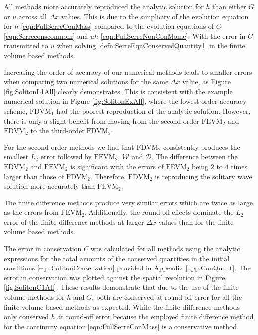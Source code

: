 All methods more accurately reproduced the analytic solution for $h$ than either $G$ or $u$ across all $\Delta x$ values. This is due to the simplicity of the evolution equation for $h$ \eqref{eqn:FullSerreConMass} compared to the evolution equations of $G$ \eqref{eqn:Serreconsconmom} and $uh$ \eqref{eqn:FullSerreNonConMome}. With the error in $G$ transmitted to $u$ when solving \eqref{defn:SerreEqnConservedQuantity1} in the finite volume based methods.

Increasing the order of accuracy of our numerical methods leads to smaller errors when comparing two numerical solutions for the same $\Delta x$ value, as Figure \ref{fig:SolitonL1All} clearly demonstrates. This is consistent with the example numerical solution in Figure \ref{fig:SolitonExAll}, where the lowest order accuracy scheme, $\text{FDVM}_1$ had the poorest reproduction of the analytic solution. However, there is only a slight benefit from moving from the second-order $\text{FEVM}_2$ and $\text{FDVM}_2$ to the third-order $\text{FDVM}_3$.

For the second-order methods we find that $\text{FDVM}_2$ consistently produces the smallest $L_2$ error followed by $\text{FEVM}_2$, $\mathcal{W}$ and $\mathcal{D}$. The difference between the $\text{FDVM}_2$ and $\text{FEVM}_2$ is significant with the errors of $\text{FEVM}_2$ being $2$ to $4$ times larger than those of $\text{FDVM}_2$. Therefore, $\text{FDVM}_2$ is reproducing the solitary wave solution more accurately than $\text{FEVM}_2$.

The finite difference methods produce very similar errors which are twice as large as the errors from $\text{FEVM}_2$. Additionally, the round-off effects dominate the $L_2$ error of the finite difference methods at larger $\Delta x$ values than for the finite volume based methods.

The error in conservation $C$ was calculated for all methods using the analytic expressions for the total amounts of the conserved quantities in the initial conditions \eqref{eqn:SolitonConservation} provided in Appendix \ref{app:ConQuant}. The error in conservation was plotted against the spatial resolution in Figure \ref{fig:SolitonC1All}. These results demonstrate that due to the use of the finite volume methods for $h$ and $G$, both are conserved at round-off error for all the finite volume based methods as expected. While the finite difference methods only conserved $h$ at round-off error because the employed finite difference method for the continuity equation \eqref{eqn:FullSerreConMass} is a conservative method. 

